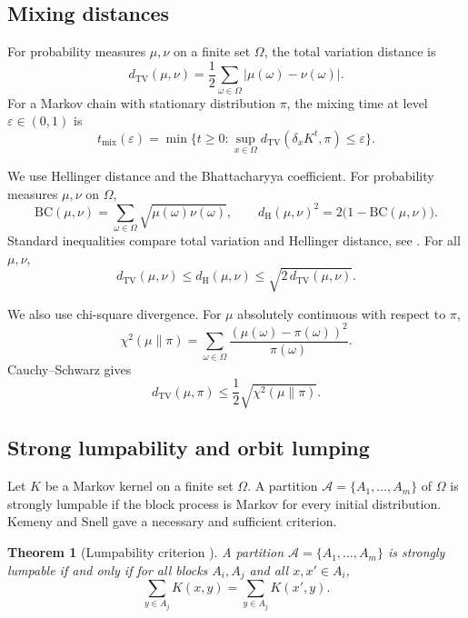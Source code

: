 \documentclass[final,3p,times]{elsarticle}
\newtheorem{theorem}{Theorem}[section]
\theoremstyle{definition}
\newcommand{\TV}{d_{\mathrm{TV}}}
\newcommand{\HH}{d_{\mathrm{H}}}
\newcommand{\BC}{\mathrm{BC}}
\begin{document}
\subsection{Mixing distances}

For probability measures $\mu,\nu$ on a finite set $\Omega$, the total variation distance is
\[
\TV(\mu,\nu) = \frac12\sum_{\omega\in\Omega}|\mu(\omega)-\nu(\omega)|.
\]
For a Markov chain with stationary distribution $\pi$, the mixing time at level $\varepsilon\in(0,1)$ is
\[
t_{\mathrm{mix}}(\varepsilon) = \min\{t\ge 0: \sup_{x\in\Omega}\TV(\delta_x K^t,\pi)\le \varepsilon\}.
\]

We use Hellinger distance and the Bhattacharyya coefficient.
For probability measures $\mu,\nu$ on $\Omega$,
\[
\BC(\mu,\nu)=\sum_{\omega\in\Omega}\sqrt{\mu(\omega)\nu(\omega)},
\qquad
\HH(\mu,\nu)^2 = 2\bigl(1-\BC(\mu,\nu)\bigr).
\]
Standard inequalities compare total variation and Hellinger distance, see \cite[Chapter 4]{LevinPeresWilmer2017}.
For all $\mu,\nu$,
\begin{equation}\label{eq:TV-H}
\TV(\mu,\nu)\le \HH(\mu,\nu)\le \sqrt{2\,\TV(\mu,\nu)}.
\end{equation}

We also use chi-square divergence.
For $\mu$ absolutely continuous with respect to $\pi$,
\[
\chi^2(\mu\|\pi)=\sum_{\omega\in\Omega}\frac{(\mu(\omega)-\pi(\omega))^2}{\pi(\omega)}.
\]
Cauchy--Schwarz gives
\begin{equation}\label{eq:TV-chi2}
\TV(\mu,\pi)\le \frac12\sqrt{\chi^2(\mu\|\pi)}.
\end{equation}

\subsection{Strong lumpability and orbit lumping}

Let $K$ be a Markov kernel on a finite set $\Omega$.
A partition $\mathcal{A}=\{A_1,\dots,A_m\}$ of $\Omega$ is strongly lumpable if the block process is Markov for every initial distribution.
Kemeny and Snell gave a necessary and sufficient criterion.

\begin{theorem}[Lumpability criterion \cite{KemenySnell1960}]\label{thm:lumpability}
A partition $\mathcal{A}=\{A_1,\dots,A_m\}$ is strongly lumpable if and only if for all blocks $A_i,A_j$ and all $x,x'\in A_i$,
\[
\sum_{y\in A_j}K(x,y)=\sum_{y\in A_j}K(x',y).
\]
\end{theorem}
\end{document}
